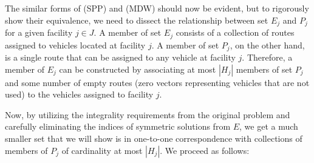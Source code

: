 The similar forms of (SPP) and (MDW) should now be evident, but to
rigorously show their equivalence, we need to dissect the relationship
between set $E_j$ and $P_j$ for a given facility $j \in J$. A member
of set $E_j$ consists of a collection of routes assigned to vehicles
located at facility $j$. A member of set $P_j$, on the other hand, is
a single route that can be assigned to any vehicle at facility $j$.
Therefore, a member of $E_j$ can be constructed by associating at most
$|H_j|$ members of set $P_{j}$ and some number of empty routes (zero
vectors representing vehicles that are not used) to the vehicles
assigned to facility $j$.

Now, by utilizing the integrality requirements from the original
problem and carefully eliminating the indices of symmetric solutions
from $E$, we get a much smaller set that we will show is in one-to-one
correspondence with collections of members of $P_j$ of cardinality at
most $|H_j|$. We proceed as follows:

